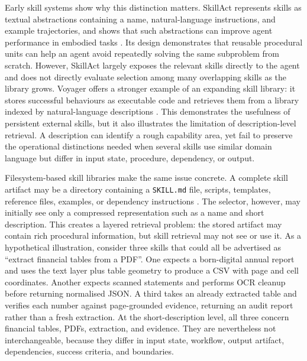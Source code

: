 Early skill systems show why this distinction matters. SkillAct represents skills as textual abstractions containing a name, natural-language instructions, and example trajectories, and shows that such abstractions can improve agent performance in embodied tasks \cite{liu2024skillact}. Its design demonstrates that reusable procedural units can help an agent avoid repeatedly solving the same subproblem from scratch. However, SkillAct largely exposes the relevant skills directly to the agent and does not directly evaluate selection among many overlapping skills as the library grows. Voyager offers a stronger example of an expanding skill library: it stores successful behaviours as executable code and retrieves them from a library indexed by natural-language descriptions \cite{wang2023voyager}. This demonstrates the usefulness of persistent external skills, but it also illustrates the limitation of description-level retrieval. A description can identify a rough capability area, yet fail to preserve the operational distinctions needed when several skills use similar domain language but differ in input state, procedure, dependency, or output.

Filesystem-based skill libraries make the same issue concrete. A complete skill artifact may be a directory containing a \texttt{SKILL.md} file, scripts, templates, reference files, examples, or dependency instructions \cite{anthropic2025skills}. The selector, however, may initially see only a compressed representation such as a name and short description. This creates a layered retrieval problem: the stored artifact may contain rich procedural information, but skill retrieval may not see or use it. As a hypothetical illustration, consider three skills that could all be advertised as ``extract financial tables from a PDF''. One expects a born-digital annual report and uses the text layer plus table geometry to produce a CSV with page and cell coordinates. Another expects scanned statements and performs OCR cleanup before returning normalised JSON. A third takes an already extracted table and verifies each number against page-grounded evidence, returning an audit report rather than a fresh extraction. At the short-description level, all three concern financial tables, PDFs, extraction, and evidence. They are nevertheless not interchangeable, because they differ in input state, workflow, output artifact, dependencies, success criteria, and boundaries.

